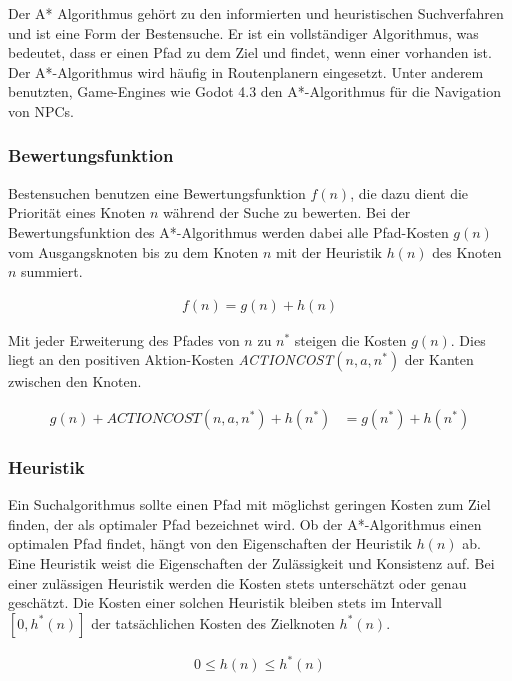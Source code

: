 Der A* Algorithmus geh\"{o}rt zu den informierten und heuristischen Suchverfahren und ist eine Form der Bestensuche. Er ist ein vollst\"{a}ndiger Algorithmus, was bedeutet, dass er einen Pfad zu dem Ziel und findet, wenn einer vorhanden ist. Der A*-Algorithmus wird h\"{a}ufig in Routenplanern eingesetzt. Unter anderem benutzten, Game-Engines wie Godot 4.3 den A*-Algorithmus f\"{u}r die Navigation von NPCs.

\subsubsection{Bewertungsfunktion}
\label{chap:a stern bewertungsfunktion}

Bestensuchen benutzen eine Bewertungsfunktion $f(n)$, die dazu dient die Priorit\"{a}t eines Knoten $n$ w\"{a}hrend der Suche zu bewerten. Bei der Bewertungsfunktion des A*-Algorithmus werden dabei alle Pfad-Kosten $g(n)$ vom Ausgangsknoten bis zu dem Knoten $n$ mit der Heuristik $h(n)$ des Knoten $n$ summiert.


\begin{align}
	f(n) = g(n) + h(n)
\end{align}


Mit jeder Erweiterung des Pfades von $n$ zu $n^{\ast}$ steigen die Kosten $g(n)$. Dies liegt an den positiven Aktion-Kosten \textit{ACTIONCOST}$(n,a,n^*)$ der Kanten zwischen den Knoten.


\begin{align}
	g(n) + \textit{ACTIONCOST}(n,a,n^*) + h(n^*) &= g(n^*) + h(n^*)
\end{align}

\subsubsection{Heuristik}

Ein Suchalgorithmus sollte einen Pfad mit m\"{o}glichst geringen Kosten zum Ziel finden, der als optimaler Pfad bezeichnet wird. Ob der A*-Algorithmus einen optimalen Pfad findet, h\"{a}ngt von den Eigenschaften der Heuristik $h(n)$ ab. Eine Heuristik weist die Eigenschaften der Zul\"{a}ssigkeit und Konsistenz auf. Bei einer zul\"{a}ssigen Heuristik werden die Kosten stets untersch\"{a}tzt oder genau gesch\"{a}tzt. Die Kosten einer solchen Heuristik bleiben stets im Intervall $[0, h^{\ast}(n)]$ der tats\"{a}chlichen Kosten des Zielknoten $h^{\ast}(n)$.

\begin{align}
			0 \leq h(n) \leq h^*(n)
\end{align}

